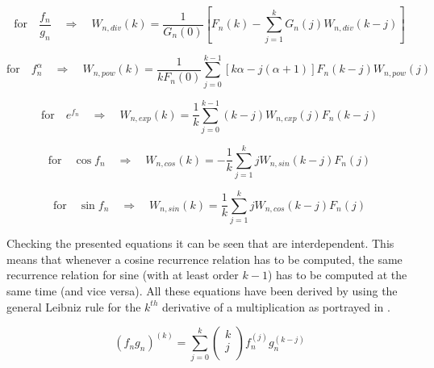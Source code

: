 \begin{equation} \label{eq:recRel3}
\text{for} \quad \dfrac{f_{n}}{g_{n}} \quad \Rightarrow \quad W_{n,div}\left(k\right)= \dfrac{1}{G_{n}\left(0\right)}\left[F_{n}\left(k\right)-\displaystyle\sum_{j=1}^{k}G_{n}\left(j\right)W_{n,div}\left(k-j\right) \right]
\end{equation}

\begin{equation} \label{eq:recRel4}
\text{for} \quad f_{n}^{\alpha} \quad \Rightarrow \quad W_{n,pow}\left(k\right)= \dfrac{1}{kF_{n}\left(0\right)} \displaystyle\sum_{j=0}^{k-1}\left[k\alpha-j\left(\alpha+1\right)\right] F_{n}\left(k-j\right)W_{n,pow}\left(j\right) 
\end{equation}

\begin{equation} \label{eq:recRel5}
\text{for} \quad e^{f_{n}} \quad \Rightarrow \quad W_{n,exp}\left(k\right)= \dfrac{1}{k}\displaystyle\sum_{j=0}^{k-1}\left(k-j\right)W_{n,exp}\left(j\right)F_{n}\left(k-j\right)
\end{equation}

\begin{equation} \label{eq:recRel6}
\text{for} \quad \cos f_{n} \quad \Rightarrow \quad W_{n,cos}\left(k\right)= -\dfrac{1}{k}\displaystyle\sum_{j=1}^{k}jW_{n,sin}\left(k-j\right)F_{n}\left(j\right)
\end{equation}

\begin{equation} \label{eq:recRel7}
\text{for} \quad \sin f_{n}  \quad \Rightarrow \quad W_{n,sin}\left(k\right)= \dfrac{1}{k}\displaystyle\sum_{j=1}^{k}jW_{n,cos}\left(k-j\right)F_{n}\left(j\right)
\end{equation}

Checking the presented equations it can be seen that  are interdependent. This means that whenever a cosine recurrence relation has to be computed, the same recurrence relation for sine (with at least order $k-1$) has to be computed at the same time (and vice versa). All these equations have been derived by \cite{jorba2005software} using the general Leibniz rule for the $k^{th}$ derivative of a multiplication as portrayed in .

\begin{equation} \label{eq:Leibniz}
\left(f_{n}g_{n}\right)^{\left( k\right)}=\displaystyle\sum_{j=0}^{k}
\left(
\begin{matrix}
k\\
j\\
\end{matrix}
\right)
f_{n}^{\left( j\right)}g_{n}^{\left( k-j\right)}
\end{equation}


